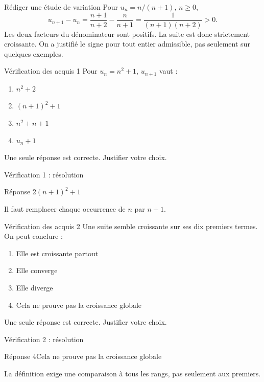 \documentclass[aspectratio=169,12pt]{beamer}
\begin{document}
\renewcommand{\slidekind}{COMPRENDRE}
\begin{frame}[t,fragile]{Rédiger une étude de variation}
Pour $u_n=n/(n+1)$, $n\ge0$,\[u_{n+1}-u_n=\frac{n+1}{n+2}-\frac n{n+1}=\frac1{(n+1)(n+2)}>0.\] Les deux facteurs du dénominateur sont positifs. La suite est donc strictement croissante. On a justifié le signe pour tout entier admissible, pas seulement sur quelques exemples.
\end{frame}
\renewcommand{\slidekind}{À VOUS DE JOUER}\begin{frame}[t]{Vérification des acquis 1}
Pour $u_n=n^2+1$, $u_{n+1}$ vaut :\begin{enumerate}
\item $n^2+2$
\item $(n+1)^2+1$
\item $n^2+n+1$
\item $u_n+1$
\end{enumerate}\medskip Une seule réponse est correcte. Justifier votre choix.\end{frame}
\renewcommand{\slidekind}{COMPRENDRE LA RÉPONSE}\begin{frame}[t]{Vérification 1 : résolution}
\begin{block}{Réponse 2}$(n+1)^2+1$\end{block}\medskip Il faut remplacer chaque occurrence de $n$ par $n+1$.\end{frame}
\renewcommand{\slidekind}{À VOUS DE JOUER}\begin{frame}[t]{Vérification des acquis 2}
Une suite semble croissante sur ses dix premiers termes. On peut conclure :\begin{enumerate}
\item Elle est croissante partout
\item Elle converge
\item Elle diverge
\item Cela ne prouve pas la croissance globale
\end{enumerate}\medskip Une seule réponse est correcte. Justifier votre choix.\end{frame}
\renewcommand{\slidekind}{COMPRENDRE LA RÉPONSE}\begin{frame}[t]{Vérification 2 : résolution}
\begin{block}{Réponse 4}Cela ne prouve pas la croissance globale\end{block}\medskip La définition exige une comparaison à tous les rangs, pas seulement aux premiers.\end{frame}
\end{document}
